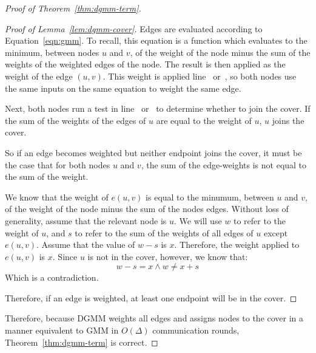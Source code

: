 \begin{proof}[Proof of Theorem~\ref{thm:dgmm-term}]
\begin{proof}[Proof of Lemma~\ref{lem:dgmm-cover}]
  Edges are evaluated according to Equation~\ref{eqn:gmm}. To recall, this equation is a function which evaluates to the minimum, between nodes $u$ and $v$, of the weight of the node minus the sum of the weights of the weighted edges of the node. The result is then applied as the weight of the edge $(u,v)$. This weight is applied line~ or~, so both nodes use the same inputs on the same equation to weight the same edge.

  Next, both nodes run a test in line~ or~ to determine whether to join the cover. If the sum of the weights of the edges of $u$ are equal to the weight of $u$, $u$ joins the cover.

  So if an edge becomes weighted but neither endpoint joins the cover, it must be the case that for both nodes $u$ and $v$, the sum of the edge-weights is not equal to the sum of the weight.

  We know that the weight of $e(u,v)$ is equal to the minumum, between $u$ and $v$, of the weight of the node minus the sum of the nodes edges. Without loss of generality, assume that the relevant node is $u$. We will use $w$ to refer to the weight of $u$, and $s$ to refer to the sum of the weights of all edges of $u$ except $e(u,v)$. Assume that the value of $w - s$ is $x$. Therefore, the weight applied to $e(u,v)$ is $x$. Since $u$ is not in the cover, however, we know that: 
\begin{equation*}
w-s = x \land w \ne x+s
\end{equation*}
Which is a contradiction.

Therefore, if an edge is weighted, at least one endpoint will be in the cover.
\end{proof}

Therefore, because DGMM weights all edges and assigns nodes to the cover in a manner equivalent to GMM in $O(\Delta)$ communication rounds, Theorem~\ref{thm:dgmm-term} is correct.
\end{proof}
